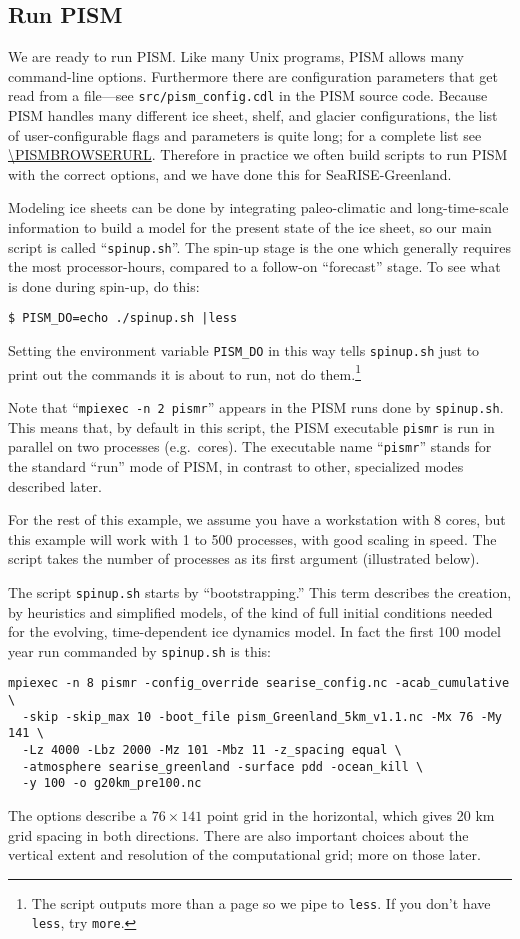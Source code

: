 \subsection{Run PISM}   \label{subsect:runscript}  We are ready to run PISM.  Like many Unix programs, PISM allows many command-line options.  Furthermore there are configuration parameters that get read from a file---see \mbox{\texttt{src/pism_config.cdl}} in the PISM source code.  Because PISM handles many different ice sheet, shelf, and glacier configurations, the list of user-configurable flags and parameters is quite long; for a complete list see \url{\PISMBROWSERURL}.  Therefore in practice we often build scripts to run PISM with the correct options, and we have done this for \mbox{SeaRISE-Greenland}.

Modeling ice sheets can be done by integrating paleo-climatic and long-time-scale information to build a model for the present state of the ice sheet, so our main script is called ``\texttt{spinup.sh}''.  The spin-up stage is the one which generally requires the most processor-hours, compared to a follow-on ``forecast'' stage.  To see what is done during spin-up, do this:
\begin{verbatim}
$ PISM_DO=echo ./spinup.sh |less
\end{verbatim}
Setting the environment variable \texttt{PISM_DO} in this way tells \texttt{spinup.sh} just to print out the commands it is about to run, not do them.\footnote{The script outputs more than a page so we pipe to \texttt{less}.  If you don't have \texttt{less}, try \texttt{more}.}

Note that ``\texttt{mpiexec -n 2 pismr}'' appears in the PISM runs done by \texttt{spinup.sh}.  This means that, by default in this script, the PISM executable \texttt{pismr} is run in parallel on two processes (e.g.~cores).  The executable name ``\texttt{pismr}'' stands for the standard ``run'' mode of PISM, in contrast to other, specialized modes described later.

For the rest of this example, we assume you have a workstation with 8 cores, but this example will work with 1 to 500 processes, with good scaling in speed.  The script takes the number of processes as its first argument (illustrated below).

The script \texttt{spinup.sh} starts by ``bootstrapping.''  This term describes the creation, by heuristics and simplified models, of the kind of full initial conditions needed for the evolving, time-dependent ice dynamics model.  In fact the first 100 model year run commanded by \texttt{spinup.sh} is this:
\small
\begin{verbatim}
mpiexec -n 8 pismr -config_override searise_config.nc -acab_cumulative \
  -skip -skip_max 10 -boot_file pism_Greenland_5km_v1.1.nc -Mx 76 -My 141 \
  -Lz 4000 -Lbz 2000 -Mz 101 -Mbz 11 -z_spacing equal \
  -atmosphere searise_greenland -surface pdd -ocean_kill \
  -y 100 -o g20km_pre100.nc
\end{verbatim}
\normalsize
The options describe a $76\times 141$ point grid in the horizontal, which gives 20 km grid spacing in both directions.  There are also important choices about the vertical extent and resolution of the computational grid; more on those later. 

